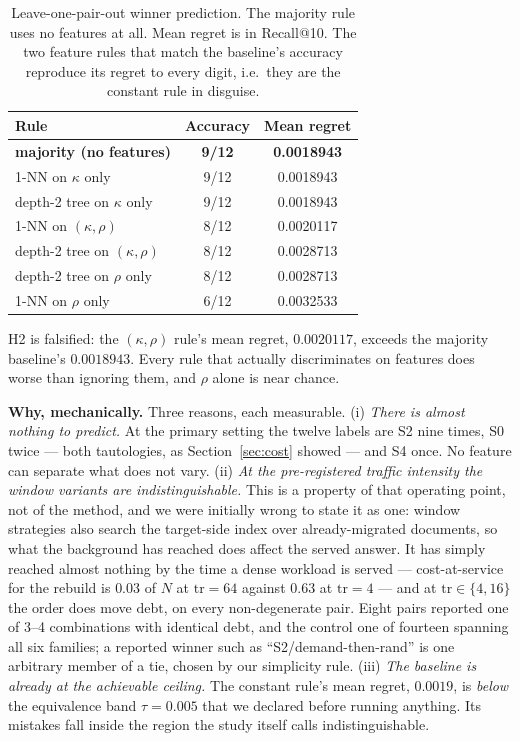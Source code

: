 \documentclass[conference]{IEEEtran}
\newcommand{\debt}{\mathrm{debt}}
\begin{document}
\begin{table}[t]
\centering
\caption{Leave-one-pair-out winner prediction. The majority rule uses no features at all.
Mean regret is in Recall@10. The two feature rules that match the baseline's accuracy
reproduce its regret to every digit, i.e.\ they are the constant rule in disguise.}
\label{tab:lopo}
\small
\begin{tabular}{@{}lcc@{}}
\toprule
Rule & Accuracy & Mean regret \\
\midrule
\textbf{majority (no features)} & \textbf{9/12} & \textbf{0.0018943} \\
1-NN on $\kappa$ only          & 9/12 & 0.0018943 \\
depth-2 tree on $\kappa$ only  & 9/12 & 0.0018943 \\
1-NN on $(\kappa, \rho)$       & 8/12 & 0.0020117 \\
depth-2 tree on $(\kappa, \rho)$ & 8/12 & 0.0028713 \\
depth-2 tree on $\rho$ only    & 8/12 & 0.0028713 \\
1-NN on $\rho$ only            & 6/12 & 0.0032533 \\
\bottomrule
\end{tabular}
\end{table}

H2 is falsified: the $(\kappa,\rho)$ rule's mean regret, $0.0020117$, exceeds the
majority baseline's $0.0018943$. Every rule that actually discriminates on features does
worse than ignoring them, and $\rho$ alone is near chance.

\textbf{Why, mechanically.} Three reasons, each measurable.
(i) \emph{There is almost nothing to predict.} At the primary setting the twelve labels
are S2 nine times, S0 twice --- both tautologies, as Section~\ref{sec:cost} showed --- and
S4 once. No feature can separate what does not vary.
(ii) \emph{At the pre-registered traffic intensity the window variants are
indistinguishable.} This is a property of that operating point, not of the method, and we
were initially wrong to state it as one: window strategies also search the target-side index
over already-migrated documents, so what the background has reached does affect the served
answer. It has simply reached almost nothing by the time a dense workload is served ---
cost-at-service for the rebuild is $0.03$ of $N$ at $\mathrm{tr}{=}64$ against $0.63$ at
$\mathrm{tr}{=}4$ --- and at $\mathrm{tr} \in \{4, 16\}$ the order does move $\debt$, on
every non-degenerate pair. Eight pairs reported
one of 3--4 combinations with identical $\debt$, and the control one of fourteen spanning
all six families; a reported winner such as ``S2/demand-then-rand'' is one arbitrary
member of a tie, chosen by our simplicity rule.
(iii) \emph{The baseline is already at the achievable ceiling.} The constant rule's mean
regret, $0.0019$, is \emph{below} the equivalence band $\tau = 0.005$ that we declared
before running anything. Its mistakes fall inside the region the study itself calls
indistinguishable.
\end{document}
